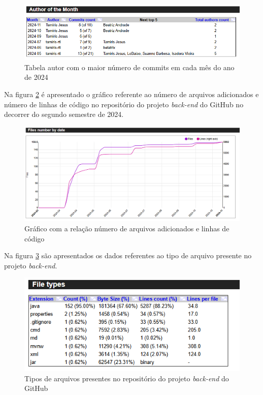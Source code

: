 \begin{figure}[ht]
        \centering
\includegraphics[width=1.0\textwidth]{images/rank-autor-stats-back.png}
        \caption{Tabela autor com o maior número de commits em cada mês do ano de 2024}
        \label{fig:rankingAutoresBack}
    \end{figure}

\newpage

Na figura \ref{fig:arquivosPorDataBack} é apresentado o gráfico referente ao número de arquivos adicionados e número de linhas de código no repositório do projeto \textit{back-end} do GitHub no decorrer do segundo semestre de 2024.

\begin{figure}[ht]
        \centering
\includegraphics[width=1.0\textwidth]{images/arquivos-por-data-stats-back.png}
        \caption{Gráfico com a relação número de arquivos adicionados e linhas de código}
        \label{fig:arquivosPorDataBack}
    \end{figure}


Na figura \ref{fig:tiposdeArquivosBack} são apresentados os dados referentes ao tipo de arquivo presente no projeto \textit{back-end}.

\begin{figure}[ht]
        \centering
\includegraphics[width=1.0\textwidth]{images/tipos-arquivos-stats-back.png}
        \caption{Tipos de arquivos presentes no repositório do projeto \textit{back-end} do GitHub}
        \label{fig:tiposdeArquivosBack}
    \end{figure}

